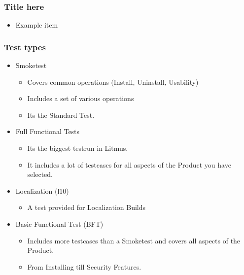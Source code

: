 \documentclass{beamer}
\begin{document}

\begin{frame}
\frametitle{Title here}
 \begin{itemize}
   \item Example item
 \end{itemize}
\end{frame}


\begin{frame}
\frametitle{Test types}
  \begin{itemize}

  \item Smoketest 
       \begin{itemize}
       \item Covers common operations (Install, Uninstall, Usability)
       \item Includes a set of various operations
       \item Its the Standard Test.
       \end{itemize}
  \item Full Functional Tests
       \begin{itemize}
       \item Its the biggest testrun in Litmus. 
       \item It includes a lot of testcases for all aspects of the Product you have selected.
       \end{itemize}
  \item Localization (l10)
       \begin{itemize}
       \item A test provided for Localization Builds
       \end{itemize}
  \item Basic Functional Test (BFT)
       \begin{itemize}
       \item Includes more testcases than a Smoketest and covers all aspects of the Product.
       \item From Installing till Security Features.
       \end{itemize}

  \end{itemize}
\end{frame}

\end{document}
